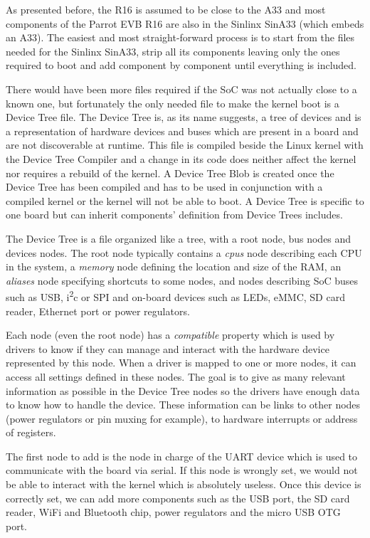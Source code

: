 As presented before, the R16 is assumed to be close to the A33 and most components of the Parrot EVB R16 are also in the Sinlinx SinA33 (which embeds an A33). The easiest and most straight-forward process is to start from the files needed for the Sinlinx SinA33, strip all its components leaving only the ones required to boot and add component by component until everything is included.

There would have been more files required if the SoC was not actually close to a known one, but fortunately the only needed file to make the kernel boot is a Device Tree file. The Device Tree is, as its name suggests, a tree of devices and is a representation of hardware devices and buses which are present in a board and are not discoverable at runtime. This file is compiled beside the Linux kernel with the Device Tree Compiler and a change in its code does neither affect the kernel nor requires a rebuild of the kernel. A Device Tree Blob is created once the Device Tree has been compiled and has to be used in conjunction with a compiled kernel or the kernel will not be able to boot. A Device Tree is specific to one board but can inherit components' definition from Device Trees includes.

The Device Tree is a file organized like a tree, with a root node, bus nodes and devices nodes. The root node typically contains a \textit{cpus} node describing each CPU in the system, a \textit{memory} node defining the location and size of the RAM, an \textit{aliases} node specifying shortcuts to some nodes, and nodes describing SoC buses such as USB, i\textsuperscript{2}c or SPI and on-board devices such as LEDs, eMMC, SD card reader, Ethernet port or power regulators.

Each node (even the root node) has a \textit{compatible} property which is used by drivers to know if they can manage and interact with the hardware device represented by this node. When a driver is mapped to one or more nodes, it can access all settings defined in these nodes. The goal is to give as many relevant information as possible in the Device Tree nodes so the drivers have enough data to know how to handle the device. These information can be links to other nodes (power regulators or pin muxing for example), to hardware interrupts or address of registers.

The first node to add is the node in charge of the UART device which is used to communicate with the board via serial. If this node is wrongly set, we would not be able to interact with the kernel which is absolutely useless. Once this device is correctly set, we can add more components such as the USB port, the SD card reader, WiFi and Bluetooth chip, power regulators and the micro USB OTG port.

